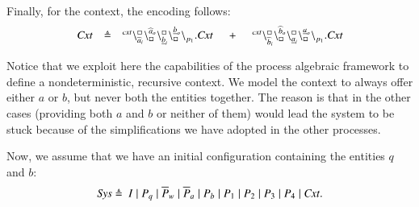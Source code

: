 Finally, for the context, the encoding follows:
\[
\begin{array}{lcl @{\hspace{0.5cm}}c@{\hspace{0.5cm}} l}
\mathit{Cxt} &\defeq &  \startchain{\mathit{cxt}}\chainedlink{\widehat{a}_i}{\noact}\chainedlink{\noact}{\widehat{a}_o}\chainedlink{\underline{b}_i}{\noact}\chainedlink{\noact}{\underline{b}_o}\chainend{p_1}.\mathit{Cxt}
&+
&\startchain{\mathit{cxt}}\chainedlink{\widehat{b}_i}{\noact}\chainedlink{\noact}{\widehat{b}_o}\chainedlink{\underline{a}_i}{\noact}\chainedlink{\noact}{\underline{a}_o}\chainend{p_1}.\mathit{Cxt}\\
\end{array}
\]

Notice that we exploit here the capabilities of the process algebraic framework to define a nondeterministic, recursive context.
We model the context to always offer either $a$ or $b$, but never both the entities together. The reason is that in
the other cases (providing both $a$ and $b$ or neither of them) would lead the system to be stuck because of the simplifications we have adopted in the other processes.

Now, we assume that we have an initial configuration containing the entities $q$ and $b$:
\[
\begin{array}{lcl}
\mathit{Sys}  \defeq \ %
 I\mid P_q \mid \overline{P}_w  \mid  \overline{P}_a  \mid P_b  \mid  P_1  \mid  P_2  \mid  P_3  \mid P_4  \mid \mathit{Cxt}.
\end{array}
\] 

